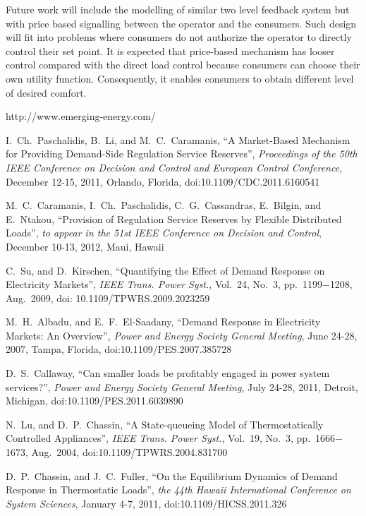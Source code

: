 \documentclass[journal]{IEEEtran}
\begin{document}
Future work will include the modelling of similar two level feedback system but with price based signalling between the operator and the consumers. Such design will fit into problems where consumers do not authorize the operator to directly control their set point. It is expected that price-based mechanism has looser control compared with the direct load control because consumers can choose their own utility function. Consequently, it enables consumers to obtain different level of desired comfort.
\begin{thebibliography}{20}
 http://www.emerging-energy.com/

 I.~Ch.~Paschalidis, B.~Li, and M.~C.~Caramanis, ``A Market-Based Mechanism for Providing Demand-Side Regulation Service Reserves'', \textit{Proceedings of the 50th IEEE Conference on Decision and Control and European Control Conference}, December 12-15, 2011, Orlando, Florida, doi:10.1109/CDC.2011.6160541

 M.~C.~Caramanis, I.~Ch.~Paschalidis, C.~G.~Cassandras, E.~Bilgin, and E.~Ntakou, ``Provision of Regulation Service Reserves by Flexible Distributed Loads'', \textit{to appear in the 51st IEEE Conference on Decision and Control}, December 10-13, 2012, Maui, Hawaii

 C.~Su, and D.~Kirschen, ``Quantifying the Effect of Demand Response on Electricity Markets'', \textit{IEEE Trans. Power Syst.}, Vol.~24, No.~3, pp.~1199$-$1208, Aug.~2009, doi: 10.1109/TPWRS.2009.2023259

 M.~H.~Albadu, and E.~F.~El-Saadany, ``Demand Response in Electricity Markets: An Overview'', \textit{Power and Energy Society General Meeting}, June 24-28, 2007, Tampa, Florida, doi:10.1109/PES.2007.385728

 D.~S.~Callaway, ``Can smaller loads be profitably engaged in power system services?'', \textit{Power and Energy Society General Meeting}, July 24-28, 2011, Detroit, Michigan, doi:10.1109/PES.2011.6039890 

 N.~Lu, and D.~P.~Chassin, ``A State-queueing Model of Thermostatically Controlled Appliances'', \textit{IEEE Trans. Power Syst.}, Vol.~19, No.~3, pp.~1666$-$1673, Aug.~2004, doi:10.1109/TPWRS.2004.831700 

 D.~P.~Chassin, and J.~C.~Fuller, ``On the Equilibrium Dynamics of Demand Response in Thermostatic Loads'', \textit{the 44th Hawaii International Conference on System Sciences}, January 4-7, 2011, doi:10.1109/HICSS.2011.326 


\end{thebibliography}
\end{document}
